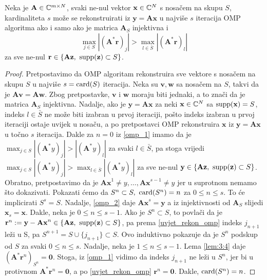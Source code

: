 \documentclass[a4paper,twoside,12pt]{memoir} %
\newcommand{\vect}[1]{\mathbf{#1}}
\renewcommand{\vec}{\vect}
\newcommand{\card}{\text{\normalfont{card}}}
\newcommand{\supp}{\text{\normalfont{supp}}}
\begin{document}
\begin{prop}\label{prop:3:5}
    Neka je $\vec A \in \C^{m \times N}$, svaki ne-nul vektor $\vec x \in \C^N$ s nosa\v{c}em na skupu $S$, kardinaliteta $s$ mo\v{z}e se rekonstruirati iz $\vec y = \vec{Ax}$ u najvi\v{s}e $s$ iteracija OMP algoritma ako i samo ako je matrica $\vec A_S$ injektivna i 
    \begin{equation}\label{uvjet_rekon_omp}
        \max_{j \in S}|(\vec A^* \vec r)_j| > \max_{l \in \bar{S}}|(\vec A^* \vec r)_l|
    \end{equation}
    za sve ne-nul $\vec r \in \{\vec{Az},\ \supp(\vec z) \subset S\}$.
\end{prop}
\begin{proof}
    Pretpostavimo da OMP algoritam rekonstruira sve vektore s nosa\v{c}em na skupu $S$ u najvi\v{s}e $s = \card(S)$ iteracija. Neka su $\vec v, \vec w$ sa nosa\v{c}em na $S$, takvi da je $\vec{Av}=\vec{Aw}$. Zbog pretpostavke, $\vec v$ i $\vec w$ moraju biti jednaki, a to zna\v{c}i da je matrica $\vec A_S$ injektivna. Nadalje, ako je $\vec y = \vec{Ax}$ za neki $\vec x \in \C^N$ sa $\supp(\vec x)=S$, indeks $l \in \bar S$ ne mo\v{z}e biti izabran u prvoj iteraciji, po\v{s}to indeks izabran u prvoj iteraciji ostaje uvijek u nosa\v{c}u, a po pretpostavci OMP rekonstruira $\vec x$ iz $\vec y = \vec{Ax}$ u to\v{c}no $s$ iteracija. Dakle za $n=0$ iz \eqref{omp_1} imamo da je $\max_{j \in S}|(\vec A^*y)_j| > |(\vec A^*y)_l|$ za svaki $l \in \bar{S}$, pa stoga vrijedi $\max_{j \in S}|(\vec A^*y)_j| > \max_{l \in \bar{S}}|(\vec A^*y)_l|$ za sve ne-nul $\vec y \in \{\vec{Az},\ \supp(\vec z) \subset S\}$. \\
    \indent
    Obratno, pretpostavimo da je $\vec{Ax}^1 \neq y,\dots,\vec{Ax}^{s-1} \neq y$ jer u suprotnom nemamo \v{s}to dokazivati. Pokazati \'cemo da $S^n \subset S,\ \card(S^n)=n$ za $0 \leq n \leq s$. To \'ce implicirati $S^s = S$. Nadalje, \eqref{omp_2} daje $\vec{Ax}^s = \vec y$ a iz injektivnosti od $\vec{A}_S$ slijedi $\vec x_s = \vec{x}$. Dakle, neka je $0 \leq n \leq s-1$. Ako je $S^n \subset S$, to povla\v{c}i da je $\vec r^n := \vec y - \vec{Ax}^n \in \{\vec{Az},\ \supp(\vec z) \subset S\}$, pa prema \eqref{uvjet_rekon_omp} indeks $j_{n+1}$ le\v{z}i u S, pa $S^{n+1} = S \cup \{j_{n+1}\} \subset S$. Ovo induktivno pokazuje da je $S^n$ podskup od $S$ za svaki $0 \leq n \leq s$. Nadalje, neka je $1 \leq n \leq s-1$. Lema \eqref{lem:3:4} daje $(\vec{A}^* \vec r^n)_{S^n} = \vec 0$. Stoga, iz \eqref{omp_1} vidimo da indeks $j_{n+1}$ ne le\v{z}i u $S^{n}$, jer bi u protivnom $\vec A^* \vec r^n = \vec 0$, a po \eqref{uvjet_rekon_omp} $\vec r^n = \vec 0$. Dakle, $\card(S^n)=n$.
\end{proof}
\end{document}
